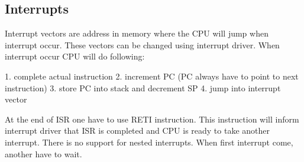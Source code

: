 \subsection{Interrupts}

Interrupt vectors are address in memory where the CPU will jump when interrupt
occur. These vectors can be changed using interrupt driver. When
interrupt occur CPU will do following:

1. complete actual instruction
2. increment PC (PC always have to point to next instruction)
3. store PC into stack and decrement SP
4. jump into interrupt vector

At the end of ISR one have to use RETI instruction. This instruction will
inform interrupt driver that ISR is completed and CPU is ready to take another
interrupt. There is no support for nested interrupts. When first interrupt
come, another have to wait.
